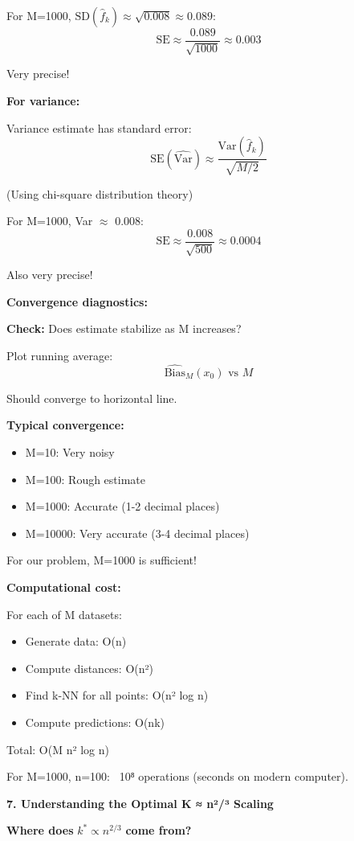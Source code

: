 \documentclass[12pt]{article}
\begin{document}
\begin{explanation}
For M=1000, $\text{SD}(\hat{f}_k) \approx \sqrt{0.008} \approx 0.089$:
\[
\text{SE} \approx \frac{0.089}{\sqrt{1000}} \approx 0.003
\]

Very precise!

\textbf{For variance:}

Variance estimate has standard error:
\[
\text{SE}(\widehat{\text{Var}}) \approx \frac{\text{Var}(\hat{f}_k)}{\sqrt{M/2}}
\]

(Using chi-square distribution theory)

For M=1000, Var $\approx$ 0.008:
\[
\text{SE} \approx \frac{0.008}{\sqrt{500}} \approx 0.0004
\]

Also very precise!

\textbf{Convergence diagnostics:}

\textbf{Check:} Does estimate stabilize as M increases?

Plot running average:
\[
\widehat{\text{Bias}}_M(x_0) \text{ vs } M
\]

Should converge to horizontal line.

\textbf{Typical convergence:}
\begin{itemize}
    \item M=10: Very noisy
    \item M=100: Rough estimate
    \item M=1000: Accurate (1-2 decimal places)
    \item M=10000: Very accurate (3-4 decimal places)
\end{itemize}

For our problem, M=1000 is sufficient!

\textbf{Computational cost:}

For each of M datasets:
\begin{itemize}
    \item Generate data: O(n)
    \item Compute distances: O(n²)
    \item Find k-NN for all points: O(n² log n)
    \item Compute predictions: O(nk)
\end{itemize}

Total: O(M n² log n)

For M=1000, n=100: ~10⁸ operations (seconds on modern computer).

\textbf{7. Understanding the Optimal K ≈ n²/³ Scaling}

\textbf{Where does} $k^* \propto n^{2/3}$ \textbf{come from?}


\end{explanation}
\end{document}
